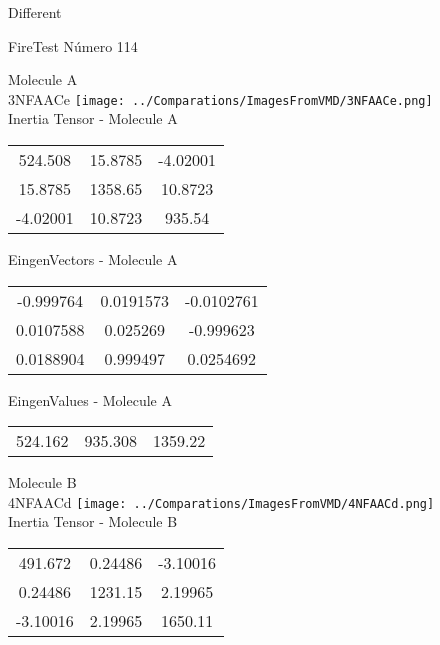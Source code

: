 \begin{center}
\vtab
\vtab
\textcolor{NavyBlue}{\Large Different}
\end{center}

 \newpage

\vtab[-2cm]
\begin{center}
{\large FireTest \tab Número 114}
\end{center}
\begin{multicols}{2}
\begin{center}

Molecule A \\ 
3NFAACe
\texttt{[image: ../Comparations/ImagesFromVMD/3NFAACe.png]}
\\
Inertia Tensor - Molecule A \\
\vtab

\begin{tabular}{|c c c|}
524.508	 & 	15.8785	 & 	-4.02001	 \\
15.8785	 & 	1358.65	 & 	10.8723	 \\
-4.02001	 & 	10.8723	 & 	935.54
\end{tabular}

\vtab
 EingenVectors - Molecule A     \\
\vtab
\begin{tabular}{|c c c|}
-0.999764	 & 	0.0191573	 & 	-0.0102761	 \\
0.0107588	 & 	0.025269	 & 	-0.999623	 \\
0.0188904	 & 	0.999497	 & 	0.0254692
\end{tabular}

\vtab
 EingenValues - Molecule A     \\
\vtab
\begin{tabular}{|c c c|}
524.162	 & 	935.308	 & 	1359.22	 \\
\end{tabular}
\columnbreak

Molecule B \\ 
4NFAACd
\texttt{[image: ../Comparations/ImagesFromVMD/4NFAACd.png]}
\\
Inertia Tensor - Molecule B \\
\vtab

\begin{tabular}{|c c c|}
491.672	 & 	0.24486	 & 	-3.10016	 \\
0.24486	 & 	1231.15	 & 	2.19965	 \\
-3.10016	 & 	2.19965	 & 	1650.11
\end{tabular}


\end{center}
\end{multicols}
